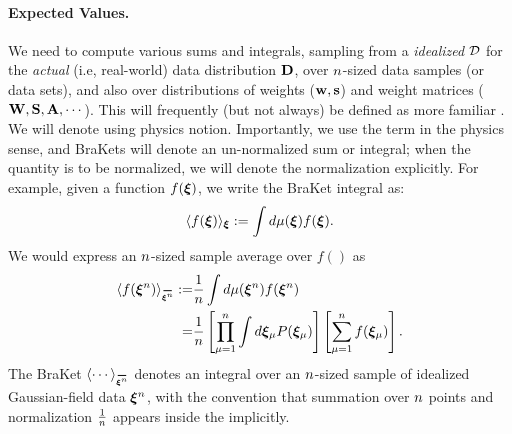 \paragraph{Expected Values.}

We need to compute various sums and integrals, sampling from a \emph{idealized} $\mathcal{D}$ for the \emph{actual} (i.e, real-world) data distribution $\mathbf{D}$,  over $n$-sized data samples (or data sets), and also over distributions of weights (${\mathbf{w}}, {\mathbf{s}}$) and weight matrices (${\mathbf{W}}, {\mathbf{S}}, \mathbf{A}, \cdots$).
This will frequently (but not always) be defined as more familiar \ExpectedValues.
We will denote \ExpectedValues using physics \BraKet notion.
Importantly, we use the term \ExpectedValue in the physics sense, and BraKets will denote an un-normalized sum or integral;
when the quantity is to be normalized, we will denote the normalization explicitly.
For example, given a function $f(\boldsymbol{\xi})$, we write the BraKet integral as:
\begin{align}
 \label{eqn:EuT}
 \langle f(\boldsymbol{\xi}) \rangle_{\boldsymbol{\xi}}:=\int d\mu(\boldsymbol{\xi}) f(\boldsymbol{\xi})  .
\end{align}
We would express an $n$-sized sample average over $f()$ as 
\begin{align}
    \label{eqn:EuT_normalized}
    \langle f(\NDXIn) \rangle_{\AVGNDXIn} :=& \frac{1}{\ND} \int d\mu(\NDXIn) f(\NDXIn) \nonumber \\
    =& \frac{1}{\ND} \left[\prod_{\mu=1}^{\ND} \int d\XI_{\mu}P(\XI_{\mu}) \right] \left[ \sum_{\mu=1}^{\ND}f(\XI_{\mu}) \right].
\end{align}
The BraKet $\langle\cdots\rangle_{\AVGNDXIn}$ denotes an integral over an $n$-sized sample of idealized
Gaussian-field data $\boldsymbol{\xi}^{n}$, with the convention that summation over $n$ points and normalization $\tfrac{1}{n}$
appears inside the \BraKet implicitly.

